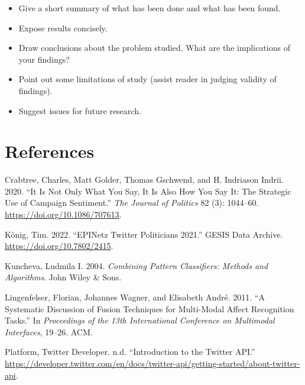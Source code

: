 \documentclass[a4paper,11pt]{article}
\newlength{\cslhangindent}
\newenvironment{CSLReferences}[2] %
 {\setlength{\cslhangindent}{#2\parindent}%
  \setlength{\parindent}{0pt}%
  \everypar{\setlength{\hangindent}{\cslhangindent}}\ignorespaces}
 {\par}
\begin{document}
\begin{itemize}
\item
  Give a short summary of what has been done and what has been found.
\item
  Expose results concisely.
\item
  Draw conclusions about the problem studied. What are the implications of your
  findings?
\item
  Point out some limitations of study (assist reader in judging validity of
  findings).
\item
  Suggest issues for future research.
\end{itemize}
\newpage

\hypertarget{references}{%
\section*{References}\label{references}}

\noindent

\setlength{\parindent}{-0.5cm}
\setlength{\leftskip}{0.5cm}
\setlength{\parskip}{8pt}

\hypertarget{refs}{}
\begin{CSLReferences}{1}{0}
\leavevmode{}%
Crabtree, Charles, Matt Golder, Thomas Gschwend, and H. Indriason Indrii. 2020. {``It {Is Not Only What You Say}, {It Is Also How You Say It}: {The Strategic Use} of {Campaign Sentiment}.''} \emph{The Journal of Politics} 82 (3): 1044--60. \url{https://doi.org/10.1086/707613}.

\leavevmode{}%
König, Tim. 2022. {``{EPINetz Twitter Politicians} 2021.''} {GESIS Data Archive}. \url{https://doi.org/10.7802/2415}.

\leavevmode{}%
Kuncheva, Ludmila I. 2004. \emph{Combining Pattern Classifiers: Methods and Algorithms}. John Wiley \& Sons.

\leavevmode{}%
Lingenfelser, Florian, Johannes Wagner, and Elisabeth André. 2011. {``A Systematic Discussion of Fusion Techniques for Multi-Modal Affect Recognition Tasks.''} In \emph{Proceedings of the 13th International Conference on Multimodal Interfaces}, 19--26. ACM.

\leavevmode{}%
Platform, Twitter Developer. n.d. {``Introduction to the {Twitter API}.''} \url{https://developer.twitter.com/en/docs/twitter-api/getting-started/about-twitter-api}.

\end{CSLReferences}
\indent
\setlength{\parindent}{17pt}
\setlength{\leftskip}{0pt}
\setlength{\parskip}{0pt}
\end{document}
